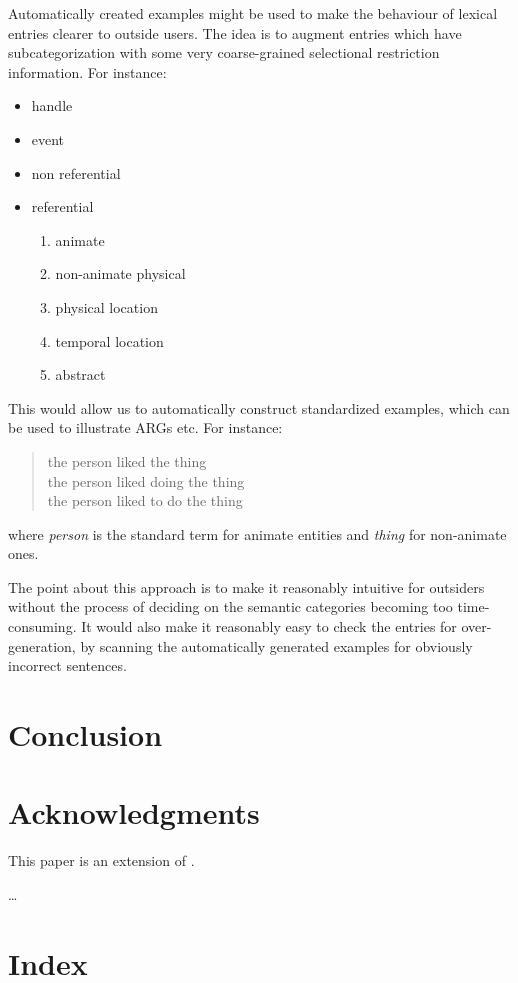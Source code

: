\documentclass[12pt]{article}
\begin{document}
Automatically created examples might be used to
make the behaviour of lexical entries clearer to outside users.
The idea is to augment entries which have subcategorization with
some very coarse-grained selectional restriction information.  For instance:
\begin{itemize}
\item handle
\item event
\item non referential
\item referential
\begin{enumerate}
\item animate
\item non-animate physical
\item physical location
\item temporal location
\item abstract
\end{enumerate}
\end{itemize}
This would allow us to automatically construct standardized examples,
which can be used to illustrate ARGs etc.
For instance:
\begin{quote}
the person liked the thing\\
the person liked doing the thing\\
the person liked to do the thing
\end{quote}
where {\it person} is the standard term for animate entities and 
{\it thing} for non-animate ones.

The point about this approach is to make it reasonably intuitive for outsiders
without the process of deciding on the semantic categories becoming too
time-consuming.  It would also make it reasonably easy to check the
entries for over-generation, by 
scanning the automatically generated examples for obviously incorrect
sentences.

\section{Conclusion}

\section{Acknowledgments}

This paper is an extension of .

\ldots




\section*{Index}
\end{document}
